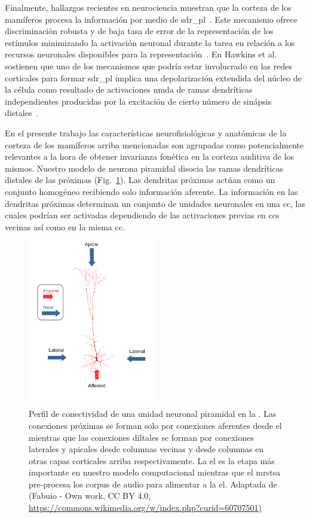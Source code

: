 {Finalmente, hallazgos recientes en neurociencia muestran que la corteza de los mamíferos procesa la información por medio de \gls{sdr_pl}~\cite{barth_2012}. Este mecanismo ofrece discriminación robusta y de baja tasa de error de la representación de los estímulos minimizando la activación neuronal durante la tarea en relación a los recursos neuronales disponibles para la representación~\cite{ahmad_2016}. En Hawkins et al. \cite{hawkins_2016} sostienen que uno de los mecanismos que podría estar involucrado en las redes corticales para formar \gls{sdr_pl} implica una depolarización extendida del núcleo de la célula como resultado de activaciones \gls{nmda} de ramas dendríticas independientes producidas por la excitación de cierto número de sinápsis distales~\cite{antic_2010, major_2013}.

En el presente trabajo las características neurofisiológicas y anatómicas de la corteza de los mamíferos arriba mencionadas son agrupadas como potencialmente relevantes a la hora de obtener invarianza fonética en la corteza auditiva de los mismos. Nuestro modelo de neurona piramidal disocia las ramas dendríticas distales de las próximas (Fig.~\ref{fig:PyramidalCell}). Las dendritas próximas actúan como un conjunto homogéneo recibiendo solo información aferente. La información en las dendritas próximas determinan un conjunto de unidades neuronales en una \gls{cc}, las cuales podrían ser activadas dependiendo de las activaciones previas en \glspl{cc} vecinas así como en la misma \gls{cc}.

\begin{figure}[h!]
    \centering
    \includegraphics[width=0.5\textwidth]{PyramidalCell.png}
    \caption{Perfil de conectividad de una unidad neuronal piramidal en la .
	    Las conexiones próximas se forman solo por conexiones aferentes desde el 
	    mientras que las conexiones diltales se forman por conexiones laterales y apicales desde columnas vecinas y
	    desde columnas en otras capas corticales arriba respectivamente.
	    La \gls{el} es la etapa más importante en nuestro modelo computacional mientras que el \gls{mrstsa} pre-procesa los corpus de audio para alimentar a la \gls{el}.
	    Adaptada de (Fabuio - Own work, CC BY 4.0, \url{https://commons.wikimedia.org/w/index.php?curid=60707501)}}
    \label{fig:PyramidalCell}
\end{figure}

}
